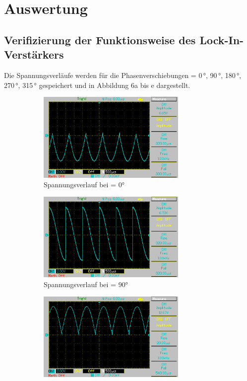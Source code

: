 \section{Auswertung}
\label{sec:Auswertung}

\subsection{Verifizierung der Funktionsweise des Lock-In-Verstärkers}
Die Spannungsverläufe werden für die Phasenverschiebungen \varphi = 0\,°, 90\,°, 180\,°, 270\,°, 315\,°
gespeichert und in Abbildung 6a bis e dargestellt.
\begin{figure}[H]
\centering
\begin{subfigure}{0.48\textwidth}
  \centering
  \includegraphics[height=4.3cm]{MAP010.png}
  \caption{Spannungsverlauf bei \varphi = 0°}
\end{subfigure}
\begin{subfigure}{0.48\textwidth}
  \centering
  \includegraphics[height=4.3cm]{MAP011.png}
  \caption{Spannungsverlauf bei \varphi = 90°}
\end{subfigure}
\begin{subfigure}{0.48\textwidth}
  \centering
  \includegraphics[height=4.3cm]{MAP013.png}

\end{subfigure}
\end{figure}
